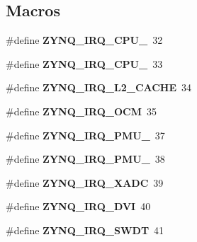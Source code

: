 \subsection*{Macros}
\begin{DoxyCompactItemize}
\item 
\mbox{\label{group__zynq__interrupt_gaf5be4c60fe52572d7768641a22fd479e}} 
\#define {\bfseries Z\+Y\+N\+Q\+\_\+\+I\+R\+Q\+\_\+\+C\+P\+U\+\_}~32
\item 
\mbox{\label{group__zynq__interrupt_ga218d75e4f886ae0b505095f333251e51}} 
\#define {\bfseries Z\+Y\+N\+Q\+\_\+\+I\+R\+Q\+\_\+\+C\+P\+U\+\_}~33
\item 
\mbox{\label{group__zynq__interrupt_ga05a7b33b1d06b585aef68c18199ae273}} 
\#define {\bfseries Z\+Y\+N\+Q\+\_\+\+I\+R\+Q\+\_\+\+L2\+\_\+\+C\+A\+C\+HE}~34
\item 
\mbox{\label{group__zynq__interrupt_ga76ec49f0b2d2d9f416adfde73f9cc563}} 
\#define {\bfseries Z\+Y\+N\+Q\+\_\+\+I\+R\+Q\+\_\+\+O\+CM}~35
\item 
\mbox{\label{group__zynq__interrupt_ga2734641a664e9ff86d4e432af65ecc11}} 
\#define {\bfseries Z\+Y\+N\+Q\+\_\+\+I\+R\+Q\+\_\+\+P\+M\+U\+\_}~37
\item 
\mbox{\label{group__zynq__interrupt_ga46829bc158c21fa2ca34555c7fbe80e1}} 
\#define {\bfseries Z\+Y\+N\+Q\+\_\+\+I\+R\+Q\+\_\+\+P\+M\+U\+\_}~38
\item 
\mbox{\label{group__zynq__interrupt_gad386a146e843b6a070fc328ee756f8d0}} 
\#define {\bfseries Z\+Y\+N\+Q\+\_\+\+I\+R\+Q\+\_\+\+X\+A\+DC}~39
\item 
\mbox{\label{group__zynq__interrupt_ga26042b5adfe6d3cebe606c36d3d2dd17}} 
\#define {\bfseries Z\+Y\+N\+Q\+\_\+\+I\+R\+Q\+\_\+\+D\+VI}~40
\item 
\mbox{\label{group__zynq__interrupt_gadf17ab4977f9962827508e85dfde31d8}} 
\#define {\bfseries Z\+Y\+N\+Q\+\_\+\+I\+R\+Q\+\_\+\+S\+W\+DT}~41

\end{DoxyCompactItemize}
